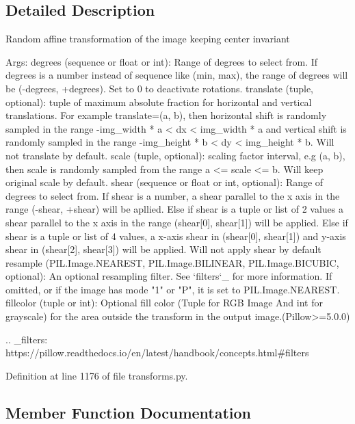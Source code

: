 \subsection{Detailed Description}
\begin{DoxyVerb}Random affine transformation of the image keeping center invariant

Args:
    degrees (sequence or float or int): Range of degrees to select from.
        If degrees is a number instead of sequence like (min, max), the range of degrees
        will be (-degrees, +degrees). Set to 0 to deactivate rotations.
    translate (tuple, optional): tuple of maximum absolute fraction for horizontal
        and vertical translations. For example translate=(a, b), then horizontal shift
        is randomly sampled in the range -img_width * a < dx < img_width * a and vertical shift is
        randomly sampled in the range -img_height * b < dy < img_height * b. Will not translate by default.
    scale (tuple, optional): scaling factor interval, e.g (a, b), then scale is
        randomly sampled from the range a <= scale <= b. Will keep original scale by default.
    shear (sequence or float or int, optional): Range of degrees to select from.
        If shear is a number, a shear parallel to the x axis in the range (-shear, +shear)
        will be apllied. Else if shear is a tuple or list of 2 values a shear parallel to the x axis in the
        range (shear[0], shear[1]) will be applied. Else if shear is a tuple or list of 4 values,
        a x-axis shear in (shear[0], shear[1]) and y-axis shear in (shear[2], shear[3]) will be applied.
        Will not apply shear by default
    resample ({PIL.Image.NEAREST, PIL.Image.BILINEAR, PIL.Image.BICUBIC}, optional):
        An optional resampling filter. See `filters`_ for more information.
        If omitted, or if the image has mode "1" or "P", it is set to PIL.Image.NEAREST.
    fillcolor (tuple or int): Optional fill color (Tuple for RGB Image And int for grayscale) for the area
        outside the transform in the output image.(Pillow>=5.0.0)

.. _filters: https://pillow.readthedocs.io/en/latest/handbook/concepts.html#filters\end{DoxyVerb}
 

Definition at line 1176 of file transforms.\+py.



\subsection{Member Function Documentation}
\mbox{\label{classtorchvision_1_1transforms_1_1transforms_1_1RandomAffine_a411a09e799bed93bc83213b41c87cdd4}} 
